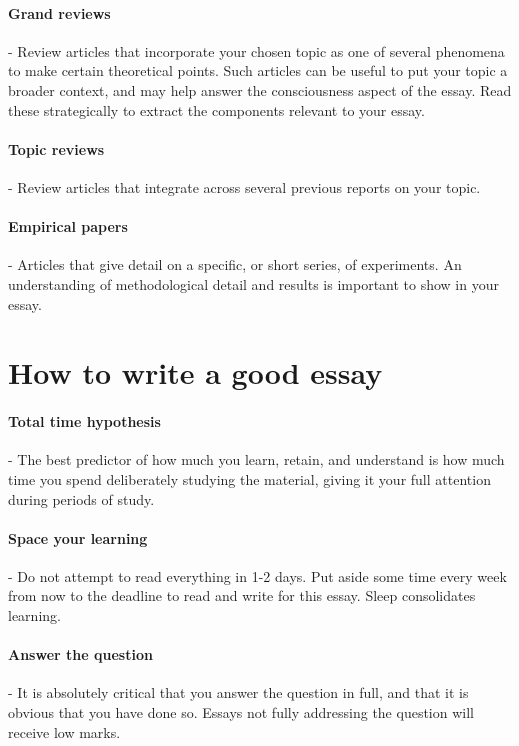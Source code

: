 \documentclass[11pt]{article}
\begin{document}
\paragraph{Grand reviews} - Review articles that incorporate your chosen topic as one of several phenomena to make certain theoretical points. Such articles can be useful to put your topic a broader context, and may help answer the consciousness aspect of the essay. Read these strategically to extract the components relevant to your essay.

\paragraph{Topic reviews} - Review articles that integrate across several previous reports on your topic. 

\paragraph{Empirical papers} - Articles that give detail on a specific, or short series, of experiments. An understanding of methodological detail and results is important to show in your essay. 

\section*{How to write a good essay}

\paragraph{Total time hypothesis} - The best predictor of how much you learn, retain, and understand is how much time you spend deliberately studying the material, giving it your full attention during periods of study. 

\paragraph{Space your learning} - Do not attempt to read everything in 1-2 days. Put aside some time every week from now to the deadline to read and write for this essay. Sleep consolidates learning.

\paragraph{Answer the question} - It is absolutely critical that you answer the question in full, and that it is obvious that you have done so. Essays not fully addressing the question will receive low marks. 
\end{document}
